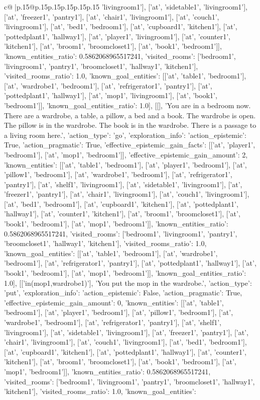 \documentclass{article}
\begin{document}
{\begin{supertabular}{c@{$\;$}|p{.15\linewidth}@{}p{.15\linewidth}p{.15\linewidth}p{.15\linewidth}p{.15\linewidth}p{.15\linewidth}}
{{{'livingroom1'], ['at', 'sidetable1', 'livingroom1'], ['at', 'freezer1', 'pantry1'], ['at', 'chair1', 'livingroom1'], ['at', 'couch1', 'livingroom1'], ['at', 'bed1', 'bedroom1'], ['at', 'cupboard1', 'kitchen1'], ['at', 'pottedplant1', 'hallway1'], ['at', 'player1', 'livingroom1'], ['at', 'counter1', 'kitchen1'], ['at', 'broom1', 'broomcloset1'], ['at', 'book1', 'bedroom1']], 'known_entities_ratio': 0.5862068965517241, 'visited_rooms': ['bedroom1', 'livingroom1', 'pantry1', 'broomcloset1', 'hallway1', 'kitchen1'], 'visited_rooms_ratio': 1.0, 'known_goal_entities': [['at', 'table1', 'bedroom1'], ['at', 'wardrobe1', 'bedroom1'], ['at', 'refrigerator1', 'pantry1'], ['at', 'pottedplant1', 'hallway1'], ['at', 'mop1', 'livingroom1'], ['at', 'book1', 'bedroom1']], 'known_goal_entities_ratio': 1.0}}], [[], 'You are in a bedroom now. There are a wardrobe, a table, a pillow, a bed and a book. The wardrobe is open. The pillow is in the wardrobe. The book is in the wardrobe. There is a passage to a living room here.', {'action_type': 'go', 'exploration_info': {'action_epistemic': True, 'action_pragmatic': True, 'effective_epistemic_gain_facts': [['at', 'player1', 'bedroom1'], ['at', 'mop1', 'bedroom1']], 'effective_epistemic_gain_amount': 2, 'known_entities': [['at', 'table1', 'bedroom1'], ['at', 'player1', 'bedroom1'], ['at', 'pillow1', 'bedroom1'], ['at', 'wardrobe1', 'bedroom1'], ['at', 'refrigerator1', 'pantry1'], ['at', 'shelf1', 'livingroom1'], ['at', 'sidetable1', 'livingroom1'], ['at', 'freezer1', 'pantry1'], ['at', 'chair1', 'livingroom1'], ['at', 'couch1', 'livingroom1'], ['at', 'bed1', 'bedroom1'], ['at', 'cupboard1', 'kitchen1'], ['at', 'pottedplant1', 'hallway1'], ['at', 'counter1', 'kitchen1'], ['at', 'broom1', 'broomcloset1'], ['at', 'book1', 'bedroom1'], ['at', 'mop1', 'bedroom1']], 'known_entities_ratio': 0.5862068965517241, 'visited_rooms': ['bedroom1', 'livingroom1', 'pantry1', 'broomcloset1', 'hallway1', 'kitchen1'], 'visited_rooms_ratio': 1.0, 'known_goal_entities': [['at', 'table1', 'bedroom1'], ['at', 'wardrobe1', 'bedroom1'], ['at', 'refrigerator1', 'pantry1'], ['at', 'pottedplant1', 'hallway1'], ['at', 'book1', 'bedroom1'], ['at', 'mop1', 'bedroom1']], 'known_goal_entities_ratio': 1.0}}], [['in(mop1,wardrobe1)'], 'You put the mop in the wardrobe.', {'action_type': 'put', 'exploration_info': {'action_epistemic': False, 'action_pragmatic': True, 'effective_epistemic_gain_amount': 0, 'known_entities': [['at', 'table1', 'bedroom1'], ['at', 'player1', 'bedroom1'], ['at', 'pillow1', 'bedroom1'], ['at', 'wardrobe1', 'bedroom1'], ['at', 'refrigerator1', 'pantry1'], ['at', 'shelf1', 'livingroom1'], ['at', 'sidetable1', 'livingroom1'], ['at', 'freezer1', 'pantry1'], ['at', 'chair1', 'livingroom1'], ['at', 'couch1', 'livingroom1'], ['at', 'bed1', 'bedroom1'], ['at', 'cupboard1', 'kitchen1'], ['at', 'pottedplant1', 'hallway1'], ['at', 'counter1', 'kitchen1'], ['at', 'broom1', 'broomcloset1'], ['at', 'book1', 'bedroom1'], ['at', 'mop1', 'bedroom1']], 'known_entities_ratio': 0.5862068965517241, 'visited_rooms': ['bedroom1', 'livingroom1', 'pantry1', 'broomcloset1', 'hallway1', 'kitchen1'], 'visited_rooms_ratio': 1.0, 'known_goal_entities': }}}
\end{supertabular}}
\end{document}
